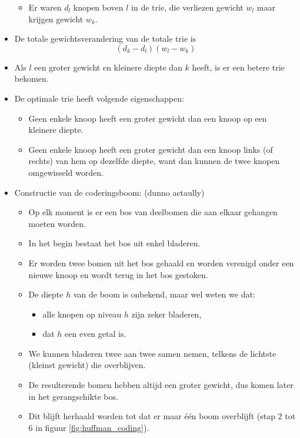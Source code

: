 \begin{itemize}
\begin{itemize}
        \item Er waren $d_l$ knopen boven $l$ in de trie, die verliezen gewicht $w_l$ maar krijgen gewicht $w_k$.
    \end{itemize}
    \item De totale gewichtsverandering van de totale trie is 
    $$(d_k - d_l)(w_l - w_k)$$
    \item Als $l$ een groter gewicht en kleinere diepte dan $k$ heeft, is er een betere trie bekomen.
    \item De optimale trie heeft volgende eigenschappen:
    \begin{itemize}
        \item Geen enkele knoop heeft een groter gewicht dan een knoop op een kleinere diepte.
        \item Geen enkele knoop heeft een groter gewicht dan een knoop links (of rechts) van hem op dezelfde diepte, want dan kunnen de twee knopen omgewisseld worden.
    \end{itemize}
    \item Constructie van de coderingsboom: (dunno actaully)
    \begin{itemize}
        \item Op elk moment is er een bos van deelbomen die aan elkaar gehangen moeten worden.
        \item In het begin bestaat het bos uit enkel bladeren.
        \item Er worden twee bomen uit het bos gehaald en worden verenigd onder een nieuwe knoop en wordt terug in het bos gestoken.
        \item De diepte $h$ van de boom is onbekend, maar wel weten we dat:
        \begin{itemize}
            \item alle knopen op niveau $h$ zijn zeker bladeren,
            \item dat $h$ een even getal is.
        \end{itemize}
        \item We kunnen bladeren twee aan twee samen nemen, telkens de lichtste (kleinst gewicht)  die overblijven.
        \item De resulterende bomen hebben altijd een groter gewicht, dus komen later in het gerangschikte bos.
        \item Dit blijft herhaald worden tot dat er maar één boom overblijft (stap 2 tot 6 in figuur \ref{fig:huffman_coding}).
    \end{itemize}
\end{itemize}


